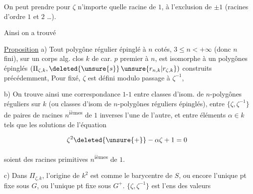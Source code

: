 
On peut prendre pour $\zeta$ n'importe quelle racine de $1$, à l'exclusion de $\pm1$ (racines d'ordre $1$ et $2$ \dots).

Ainsi on a trouvé

\uline{Proposition} a) Tout  polygône régulier épinglé à $n$ cotés, $3\leq n<+\infty$ (donc $n$ fini), sur un corps alg. clos $k$ de car. $p$ premier à $n$, est isomorphe à un  polygônes épinglés $(\Pi_{\zeta,k},\deleted{\unsure{s}}\,\unsure{r_{n,k}|r_{\zeta,k}})$  construits précédemment,  Pour  fixé, $\zeta$ est défini modulo passage à $\zeta^{-1}$, 

b) On trouve ainsi une correspondance $1$-$1$ entre classes d'isom. de $n$-polygônes réguliers sur $k$ (ou classes d'isom de $n$-polygônes réguliers épinglés), entre   $\{\zeta,\zeta^{-1}\}$ de paires de racines  $n$\textsuperscript{ièmes} de $1$ inverses l'une de l'autre, et entre éléments $\alpha\in k$ tels que les  solutions de l'équation


\[\zeta^2\deleted{\unsure{+}}-\alpha\zeta+1=0\]

soient des racines primitives $n$\textsuperscript{ièmes} de $1$.

c) Dans $\Pi_{\zeta,k}$, l'origine de $k^2$ est  comme le barycentre de $S$, ou encore l'unique pt fixe sous $G$, ou l'unique pt fixe sous $G^+$. $\{\zeta,\zeta^{-1}\}$ est l'ens des valeurs

